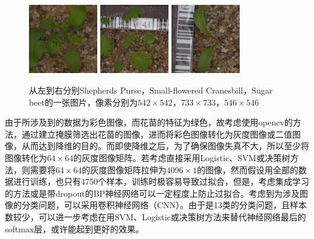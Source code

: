 \begin{figure}[htbp]
\centering
\includegraphics[width=30mm,height=30mm]{../figures/Shepherds_Purse_0bef4ae08.png} 	
\includegraphics[width=30mm,height=30mm]{../figures/Small-flowered_Cranesbill_0e7f05ec0.png} 	
\includegraphics[width=30mm,height=30mm]{../figures/Sugar_beet_1bdfd2206.png}
\caption{从左到右分别Shepherds Purse，Small-flowered Cranesbill，Sugar beet的一张图片，像素分别为$542\times542$，$733\times733$，$546\times546$}
\label{fig:myl4}
\end{figure}

由于所涉及到的数据为彩色图像，而花苗的特征为绿色，故考虑使用opencv的方法，通过建立掩膜筛选出花苗的图像，进而将彩色图像转化为灰度图像或二值图像，从而达到降维的目的。而即使降维之后，为了确保图像失真不大，所以至少将图像转化为$64\times 64$的灰度图像矩阵。若考虑直接采用Logistic、SVM或决策树方法，则需要将$64\times 64$的灰度图像矩阵拉伸为$4096\times 1$的图像，然而假设用全部的数据进行训练，也只有4750个样本，训练时极容易导致过拟合，但是，考虑集成学习的方法或是带dropout的BP神经网络可以一定程度上防止过拟合。考虑到为涉及图像的分类问题，可以采用卷积神经网络（CNN）。由于是13类的分类问题，且样本数较少，可以进一步考虑在用SVM、Logistic或决策树方法来替代神经网络最后的softmax层，或许能起到更好的效果。